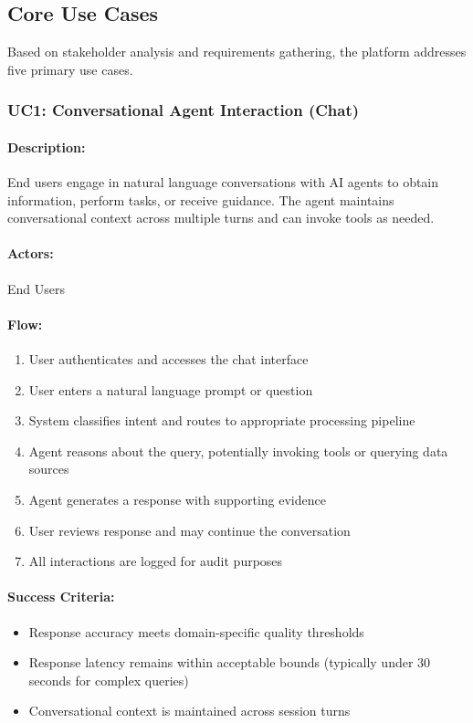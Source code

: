 \subsection{Core Use Cases}

Based on stakeholder analysis and requirements gathering, the platform addresses five primary use cases.

\subsubsection{UC1: Conversational Agent Interaction (Chat)}

\paragraph{Description:} End users engage in natural language conversations with AI agents to obtain information, perform tasks, or receive guidance. The agent maintains conversational context across multiple turns and can invoke tools as needed.

\paragraph{Actors:} End Users

\paragraph{Flow:}
\begin{enumerate}
    \item User authenticates and accesses the chat interface
    \item User enters a natural language prompt or question
    \item System classifies intent and routes to appropriate processing pipeline
    \item Agent reasons about the query, potentially invoking tools or querying data sources
    \item Agent generates a response with supporting evidence
    \item User reviews response and may continue the conversation
    \item All interactions are logged for audit purposes
\end{enumerate}

\paragraph{Success Criteria:}
\begin{itemize}
    \item Response accuracy meets domain-specific quality thresholds
    \item Response latency remains within acceptable bounds (typically under 30 seconds for complex queries)
    \item Conversational context is maintained across session turns
\end{itemize}

